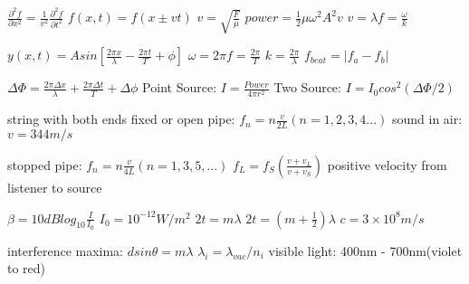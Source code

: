 \documentclass{exam}
\begin{document}
$\frac{\partial^2f}{\partial x^2}=\frac{1}{v^2}\frac{\partial^2f}{\partial t^2}$ 
$f(x,t) = f(x \pm vt)$
$v=\sqrt{\frac{F}{\mu}}$
$power = \frac{1}{2} \mu \omega^2 A^2 v$
$v = \lambda f = \frac{\omega}{k}$

$y(x,t) = A sin\left[\frac{2\pi x}{\lambda}-\frac{2\pi t}{T}+\phi\right]$
$\omega = 2\pi f = \frac{2\pi}{T}$
$k=\frac{2\pi}{\lambda}$
$f_{beat}=|f_a-f_b|$

$\Delta \Phi = \frac{2\pi \Delta x}{\lambda}+\frac{2\pi \Delta t}{T}+\Delta \phi$
Point Source: $I = \frac{Power}{4\pi r^2}$
Two Source: $I = I_0 cos^2(\Delta \Phi/2)$




string with both ends fixed or open pipe: $f_n=n\frac{v}{2L}(n=1,2,3,4...)$
sound in air: $v=344m/s$

stopped pipe: $f_n = n\frac{v}{4L} (n=1, 3, 5, ...)$
$f_L=f_S\left( \frac{v+v_L}{v+v_S}\right)$ positive velocity from listener to source

$\beta = 10dB log_{10}\frac{I}{I_0}$
\hspace{2mm}
$I_0=10^{-12}W/m^2$
$2t = m\lambda$
\hspace{4mm}
$2t = (m+\frac{1}{2})\lambda$
$c = 3\times10^8m/s$

interference maxima: $d sin\theta = m\lambda$
$\lambda_i = \lambda_{vac}/n_i$
visible light: 400nm - 700nm(violet to red)
\end{document}
